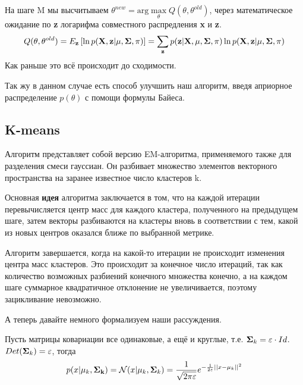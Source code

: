 На шаге M мы высчитываем 
$\theta^{new} = \mathrm{arg} \max\limits_{\theta} Q(\theta,\theta^{old})$, через
математическое ожидание по {\bf z} логарифма совместного распредления {\bf x} и {\bf z}. 
\[
Q(\theta,\theta^{old}) =
E_{\bf z} \left[\ln p({\bf X, z}|\mu,{\bf \Sigma}, \pi)\right] = \sum\limits_{{\bf z}} p({\bf z|X},\mu,{\bf \Sigma}, \pi) \ln p({\bf X, z}|\mu,{\bf \Sigma}, \pi) 
\]
Как раньше это всё происходит до сходимости.


Так жу в данном случае есть способ улучшить наш алгоритм, введя априорное распределение $p(\theta)$ с помощи формулы Байеса.


\subsection{K-means}

Алгоритм представляет собой версию EM-алгоритма, применяемого также для разделения смеси гауссиан. Он разбивает множество элементов векторного пространства на заранее известное число кластеров k.

Основная {\bf идея} алгоритма заключается в том, что на каждой итерации перевычисляется центр масс для каждого кластера, полученного на предыдущем шаге, затем векторы разбиваются на кластеры вновь в соответствии с тем, какой из новых центров оказался ближе по выбранной метрике.

Алгоритм завершается, когда на какой-то итерации не происходит изменения центра масс кластеров. Это происходит за конечное число итераций, так как количество возможных разбиений конечного множества конечно, а на каждом шаге суммарное квадратичное отклонение не увеличивается, поэтому зацикливание невозможно.


А теперь давайте немного формализуем наши рассуждения.

Пусть матрицы ковариации все одинаковые, а ещё и круглые, т.е. ${\bf \Sigma}_k = \varepsilon \cdot Id$. $Det({\bf \Sigma}_k) = \varepsilon$, тогда 
\[
p(x|\mu_k, {\bf {\bf \Sigma}_k}) = \mathcal{N}(x|\mu_k,{\bf \Sigma}_k) = \frac{1}{\sqrt{2\pi \varepsilon}} e^{-\frac{1}{2\varepsilon} ||x - \mu_k||^2}
\]

